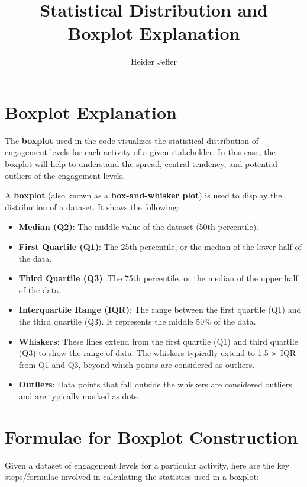 \documentclass{article}
\title{Statistical Distribution and Boxplot Explanation}
\author{Heider Jeffer}
\date{}
\begin{document}
	
	\maketitle
	
	\section*{Boxplot Explanation}
	
	The \textbf{boxplot} used in the code visualizes the statistical distribution of engagement levels for each activity of a given stakeholder. In this case, the boxplot will help to understand the spread, central tendency, and potential outliers of the engagement levels.
	
	A \textbf{boxplot} (also known as a \textbf{box-and-whisker plot}) is used to display the distribution of a dataset. It shows the following:
	
	\begin{itemize}
		\item \textbf{Median (Q2)}: The middle value of the dataset (50th percentile).
		\item \textbf{First Quartile (Q1)}: The 25th percentile, or the median of the lower half of the data.
		\item \textbf{Third Quartile (Q3)}: The 75th percentile, or the median of the upper half of the data.
		\item \textbf{Interquartile Range (IQR)}: The range between the first quartile (Q1) and the third quartile (Q3). It represents the middle 50\% of the data.
		\item \textbf{Whiskers}: These lines extend from the first quartile (Q1) and third quartile (Q3) to show the range of data. The whiskers typically extend to 1.5 $\times$ IQR from Q1 and Q3, beyond which points are considered as outliers.
		\item \textbf{Outliers}: Data points that fall outside the whiskers are considered outliers and are typically marked as dots.
	\end{itemize}
	
	\section*{Formulae for Boxplot Construction}
	
	Given a dataset of engagement levels for a particular activity, here are the key steps/formulae involved in calculating the statistics used in a boxplot:
	
\end{document}
